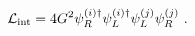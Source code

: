 \begin{equation}
{\cal L}_{\rm int} = 4 G^2 \psi_R^{(i)\dagger} \psi_L^{(i)\dagger} \psi_L^{(j)} \psi_R^{(j)} \ .
\label{eq3p}
\end{equation}

